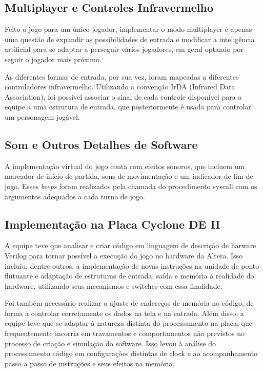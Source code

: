 \documentclass[12pt, a4paper, twocolumn]{article}
\begin{document}
\newpage


\subsection{Multiplayer e Controles Infravermelho}

Feito o jogo para um único jogador, implementar o modo multiplayer é apenas uma questão de expandir as possibilidades de entrada e modificar a inteligência artificial para se adaptar a perseguir vários jogadores, em geral optando por seguir o jogador mais próximo.

As diferentes formas de entrada, por sua vez, foram mapeadas a diferentes controladores infravermelho. Utilizando a convenção IrDA (Infrared Data Association), foi possível associar o sinal de cada controle disponível para a equipe a uma estrutura de entrada, que posteriormente é usada para controlar um personagem jogável.


\subsection{Som e Outros Detalhes de Software}

A implementação virtual do jogo conta com efeitos sonoros, que incluem um marcador de início de partida, sons de movimentação e um indicador de fim de jogo. Esses \textit{beeps} foram realizados pela chamada do procedimento syscall com os argumentos adequados a cada turno de jogo. 

\subsection{Implementação na Placa Cyclone DE II}

A equipe teve que analisar e criar código em linguagem de descrição de harware Verilog para tornar possível a execução do jogo no hardware da Altera. Isso incluiu, dentre outros, a implementação de novas instruções na unidade de ponto flutuante e adaptação de estruturas de entrada, saída e memória à realidade do hardware, utilizando seus mecanismos e switches com essa finalidade.

Foi também necessário realizar o ajuste de endereços de memória no código, de forma a controlar corretamente os dados na tela e na entrada. Além disso, a equipe teve que se adaptar à natureza distinta do processamento na placa, que frequentemente incorria em travamentos e comportamentos não previstos no processo de criação e simulação do software. Isso levou à análise do processamento código em configurações distintas de clock e ao acompanhamento passo a passo de instruções e seus efeitos na memória.
\end{document}
